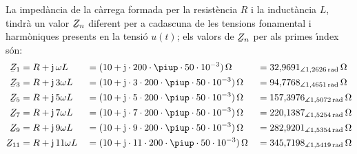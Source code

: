\begin{exemple}
La imped\`{a}ncia de la c\`{a}rrega formada per la resist\`{e}ncia $R$ i la
induct\`{a}ncia $L$, tindr\`{a} un valor $\cmplx{Z}_n$ diferent per a
cadascuna de les tensions fonamental i harm\`{o}niques presents en la
tensi\'{o} $u(t)$; els valors de $\cmplx{Z}_n$ per als primes \'{\i}ndex s\'{o}n:
\begin{alignat*}{3}
    \cmplx{Z}_1 &= R + \ju\, \omega L &&= (10 + \ju\cdot 200\cdot \piup\cdot 50\cdot 10^{-3})\unit{\ohm} &&=32{,}9691_{\measuredangle
    1{,}2626\unit{rad}}\unit{\ohm}\\
    \cmplx{Z}_3 &= R + \ju\, 3 \omega L &&= (10 + \ju\cdot 3\cdot 200\cdot \piup\cdot 50\cdot 10^{-3})\unit{\ohm} &&=94{,}7768_{\measuredangle
    1{,}4651\unit{rad}}\unit{\ohm}\\
    \cmplx{Z}_5 &= R + \ju\, 5 \omega L &&= (10 + \ju\cdot 5\cdot 200\cdot \piup\cdot 50\cdot 10^{-3})\unit{\ohm} &&=157{,}3976_{\measuredangle
    1{,}5072\unit{rad}}\unit{\ohm}\\
    \cmplx{Z}_7 &= R + \ju\, 7 \omega L &&= (10 + \ju\cdot 7\cdot 200\cdot \piup\cdot 50\cdot 10^{-3})\unit{\ohm} &&=220{,}1387_{\measuredangle
    1{,}5254\unit{rad}}\unit{\ohm}\\
    \cmplx{Z}_9 &= R + \ju\, 9 \omega L &&= (10 + \ju\cdot 9\cdot 200\cdot \piup\cdot 50\cdot 10^{-3})\unit{\ohm} &&=282{,}9201_{\measuredangle
    1{,}5354\unit{rad}}\unit{\ohm}\\
    \cmplx{Z}_{11} &= R + \ju\, 11 \omega L &&= (10 + \ju\cdot 11\cdot 200\cdot \piup\cdot 50\cdot 10^{-3})\unit{\ohm} &&=345{,}7198_{\measuredangle
    1{,}5419\unit{rad}}\unit{\ohm}
\end{alignat*}


\end{exemple}
